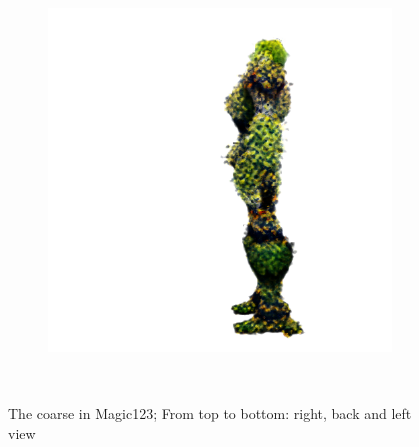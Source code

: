 \begin{figure}[ht]
\begin{subfigure}[b]{0.222\textwidth}
        \includegraphics[width=\textwidth]{etc/a robot made out of plants/magic123/magic123_coarse_robot_left_10000_part1.png}
        \caption{}
    \end{subfigure}
    \caption{The coarse in Magic123; From top to bottom: right, back and left view}~\label{fig:generationCoarseMagic123}
\end{figure}

